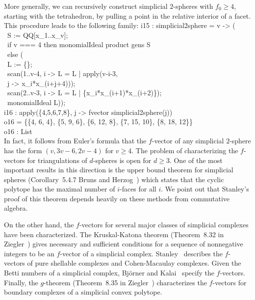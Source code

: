 More generally, we can recursively construct simplicial $2$-spheres
with $f_{0} \geq 4$, starting with the tetrahedron, by pulling a point
in the relative interior of a facet.  This procedure leads to the
following family:
\beginOutput
i15 : simplicial2sphere = v -> ( \\
\           S := QQ[x_1..x_v]; \\
\           if v === 4 then monomialIdeal product gens S \\
\           else ( \\
\                L := \{\};\\
\                scan(1..v-4, i -> L = L | apply(v-i-3, \\
\                          j -> x_i*x_(i+j+4))); \\
\                scan(2..v-3, i -> L = L | \{x_i*x_(i+1)*x_(i+2)\}); \\
\                monomialIdeal L));\\
\endOutput
\beginOutput
i16 : apply(\{4,5,6,7,8\}, j -> fvector simplicial2sphere(j))\\
\emptyLine
o16 = \{\{4, 6, 4\}, \{5, 9, 6\}, \{6, 12, 8\}, \{7, 15, 10\}, \{8, 18, 12\}\}\\
\emptyLine
o16 : List\\
\endOutput
In fact, it follows from Euler's formula that the $f$-vector of any
simplicial $2$-sphere has the form $(v, 3v-6, 2v-4)$ for $v \geq 4$.
The problem of characterizing the $f$-vectors for triangulations of
$d$-spheres is open for $d \geq 3$.  One of the most important results
in this direction is the upper bound theorem for simplicial spheres
(Corollary~5.4.7 Bruns and Herzog~\cite{MR95h:13020}) which states
that the cyclic polytope has the maximal number of $i$-faces for all
$i$.  We point out that Stanley's proof of this theorem depends
heavily on these methods from commutative algebra.

On the other hand, the $f$-vectors for several major classes of
simplicial complexes have been characterized.  The Kruskal-Katona
theorem (Theorem~8.32 in Ziegler~\cite{MR96a:52011}) gives necessary
and sufficient conditions for a sequence of nonnegative integers to be
an $f$-vector of a simplicial complex.  Stanley~\cite{MR98h:05001}
describes the $f$-vectors of pure shellable complexes and
Cohen-Macaulay complexes.  Given the Betti numbers of a simplicial
complex, Bj\"{o}rner and Kalai~\cite{MR89m:52009} specify the
$f$-vectors.  Finally, the $g$-theorem (Theorem~8.35 in
Ziegler~\cite{MR96a:52011}) characterizes the $f$-vectors for boundary
complexes of a simplicial convex polytope.

